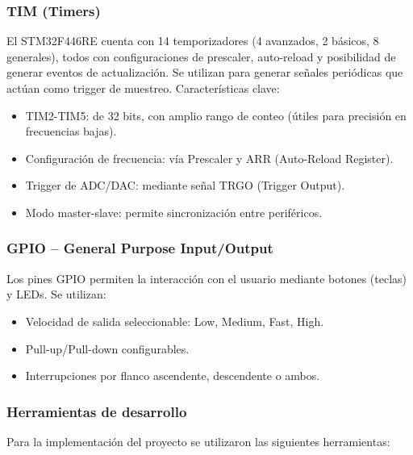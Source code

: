 \documentclass[12pt]{article}
\begin{document}
	\subsubsection{TIM (Timers)}
	El STM32F446RE cuenta con 14 temporizadores (4 avanzados, 2 básicos, 8 generales), todos con configuraciones de prescaler, auto-reload y posibilidad de generar eventos de actualización. Se utilizan para generar señales periódicas que actúan como trigger de muestreo. Características clave:
	\begin{itemize}
		\item TIM2-TIM5: de 32 bits, con amplio rango de conteo (útiles para precisión en frecuencias bajas).
		
		\item Configuración de frecuencia: vía Prescaler y ARR (Auto-Reload Register).
		
		\item Trigger de ADC/DAC: mediante señal TRGO (Trigger Output).
		
		\item Modo master-slave: permite sincronización entre periféricos.
	\end{itemize}
	
	\subsubsection{GPIO – General Purpose Input/Output}
	Los pines GPIO permiten la interacción con el usuario mediante botones (teclas) y LEDs. Se utilizan:
	
	\begin{itemize}
		\item Velocidad de salida seleccionable: Low, Medium, Fast, High.
		
		\item Pull-up/Pull-down configurables.
		
		\item Interrupciones por flanco ascendente, descendente o ambos.
	\end{itemize}
	
	\subsubsection{Herramientas de desarrollo}
	Para la implementación del proyecto se utilizaron las siguientes herramientas:
	
\end{document}

